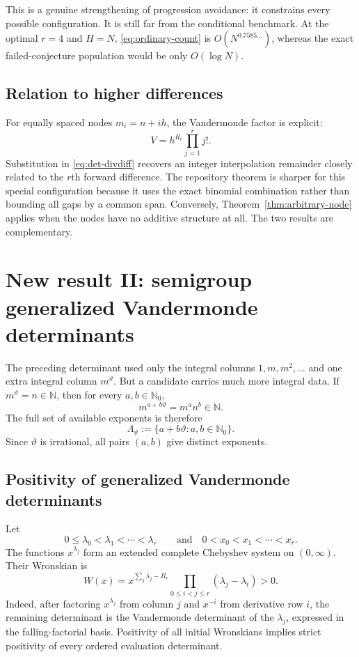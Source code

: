 \documentclass[11pt,oneside]{article}
\theoremstyle{definition}
\theoremstyle{remark}
\newcommand{\N}{\mathbb N}
\newcommand{\Nzero}{\mathbb N_0}
\newcommand{\thetaq}{\vartheta}
\newcommand{\LambdaTheta}{\Lambda_{\thetaq}}
\begin{document}
This is a genuine strengthening of progression avoidance: it constrains every possible
configuration.  It is still far from the conditional benchmark.  At the optimal $r=4$ and
$H=N$, \eqref{eq:ordinary-count} is $O(N^{0.7585\ldots})$, whereas the exact failed-conjecture
population would be only $O(\!\log N)$.

\subsection{Relation to higher differences}

For equally spaced nodes $m_i=n+ih$, the Vandermonde factor is explicit:
\[
 V=h^{R_r}\prod_{j=1}^{r}j!.
\]
Substitution in \eqref{eq:det-divdiff} recovers an integer interpolation remainder closely
related to the $r$th forward difference.  The repository theorem is sharper for this special
configuration because it uses the exact binomial combination rather than bounding all gaps
by a common span.  Conversely, Theorem~\ref{thm:arbitrary-node} applies when the nodes have no
additive structure at all.  The two results are complementary.

\section{New result II: semigroup generalized Vandermonde determinants}
\label{sec:semigroup}

The preceding determinant used only the integral columns
$1,m,m^2,\ldots$ and one extra integral column $m^{\thetaq}$.  But a candidate carries much
more integral data.  If $m^{\thetaq}=n\in\N$, then for every $a,b\in\Nzero$,
\begin{equation}
 m^{a+b\thetaq}=m^a n^b\in\N.
 \label{eq:mixed-integrality}
\end{equation}
The full set of available exponents is therefore
\[
 \LambdaTheta:=\{a+b\thetaq:a,b\in\Nzero\}.
\]
Since $\thetaq$ is irrational, all pairs $(a,b)$ give distinct exponents.

\subsection{Positivity of generalized Vandermonde determinants}

Let
\[
 0\le\lambda_0<\lambda_1<\cdots<\lambda_r
\qquad\text{and}\quad
 0<x_0<x_1<\cdots<x_r.
\]
The functions $x^{\lambda_j}$ form an extended complete Chebyshev system on $(0,\infty)$.
Their Wronskian is \cite{KarlinStudden}
\begin{equation}
 W(x)
 =x^{\sum_j\lambda_j-R_r}
   \prod_{0\le i<j\le r}(\lambda_j-\lambda_i)>0.
 \label{eq:wronskian}
\end{equation}
Indeed, after factoring $x^{\lambda_j}$ from column $j$ and $x^{-i}$ from derivative row
$i$, the remaining determinant is the Vandermonde determinant of the $\lambda_j$, expressed
in the falling-factorial basis.  Positivity of all initial Wronskians implies strict positivity
of every ordered evaluation determinant.
\end{document}
